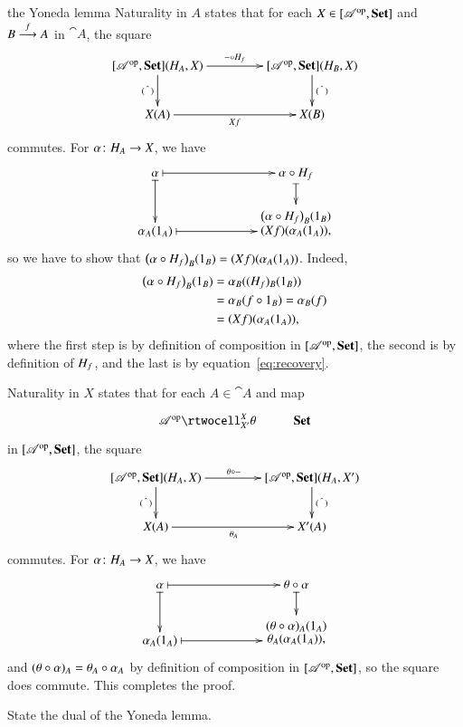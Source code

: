 \begin{pfof}{the Yoneda lemma}
Naturality in $A$ states that for each $X \in [\mathscr{A}^{\mathrm{op}},\mathbf{Set}]$ and
$B \stackrel{f}{\longrightarrow} A$ in $\cat{A}$, the square
\[
\xymatrix@C+2em{
\pshf{\cat{A}}(\h_A, X) \ar[r]^{\dashbk \of \h_f} \ar[d]_{\yel{\blank}} &
\pshf{\cat{A}}(\h_B, X) \ar[d]^{\yel{\blank}}   \\
X(A) \ar[r]_{Xf}        &
X(B)
}
\]
commutes.  For $\alpha\from \h_A \to X$, we have
\[
\xymatrix@C+4em{
\alpha \ar@{|->}[r] \ar@{|->}[d]    &
\alpha \of \h_f \ar@{|->}[d]    \\
\alpha_A(1_A) \ar@{|->}[r]    &
*!<0mm,-1.4ex>+\txt{$\bigl(\alpha \of \h_f\bigr)_B(1_B)$\\
$(Xf)(\alpha_A(1_A))$,}
}
\]
so we have to show that $\bigl(\alpha \mathbin{\circ} H_f\bigr)_B(1_B)=
(Xf)(\alpha_A(1_A))$.  Indeed,
%
\begin{align*}
\bigl( \alpha \mathbin{\circ} H_f \bigr)_B(1_B)    &
=
\alpha_B ((H_f)_B (1_B)) \\
&
=
\alpha_B (f \mathbin{\circ} 1_B)
=
\alpha_B(f) \\
&
=
(Xf)(\alpha_A(1_A)),
\end{align*}
%
where the first step is by definition of composition in $[\mathscr{A}^{\mathrm{op}},\mathbf{Set}]$,
the second is by definition of $H_f$, and the last is by
equation~\eqref{eq:recovery}.

Naturality in $X$ states that for each $A \in \cat{A}$ and map
\[
\xymatrix{
\cat{A}^\op \rtwocell^{X}_{X'}{\theta} &\Set
}
\]
in $[\mathscr{A}^{\mathrm{op}},\mathbf{Set}]$, the square
\[
\xymatrix@C+2em{
\pshf{\cat{A}}(\h_A, X)  \ar[r]^{\theta \of \dashbk} \ar[d]_{\yel{\blank}} &
\pshf{\cat{A}}(\h_A, X') \ar[d]^{\yel{\blank}}  \\
X(A) \ar[r]_{\theta_A}  &
X'(A)
}
\]
commutes.  For $\alpha\from \h_A \to X$, we have
\[
\xymatrix@C+4em{
\alpha \ar@{|->}[r] \ar@{|->}[d]    &
\theta \of \alpha \ar@{|->}[d]    \\
\alpha_A(1_A) \ar@{|->}[r]    &
*!<0mm,-1.4ex>+\txt{$(\theta \of \alpha)_A(1_A)$\\
$\theta_A(\alpha_A(1_A))$,}
}
\]
and $(\theta\mathbin{\circ}\alpha)_A = \theta_A \mathbin{\circ} \alpha_A$ by definition of composition
in $[\mathscr{A}^{\mathrm{op}},\mathbf{Set}]$, so the square does commute.  This completes the proof.
\end{pfof}


\exs


\begin{question}
State the dual of the Yoneda lemma.
\end{question}


